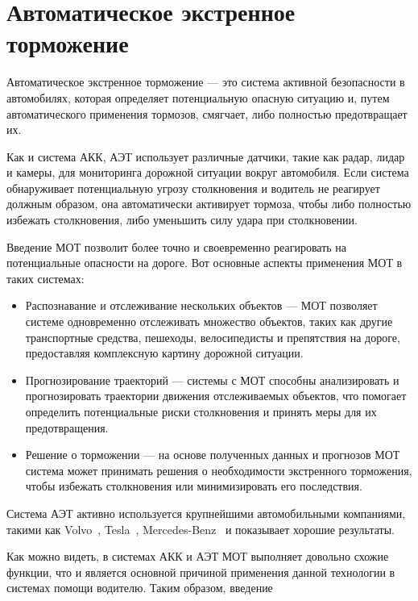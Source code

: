 \section{Автоматическое экстренное торможение}

Автоматическое экстренное торможение --- это система активной безопасности в автомобилях, которая определяет потенциальную опасную ситуацию и, путем автоматического применения тормозов, смягчает, либо полностью предотвращает их. 

Как и система АКК, АЭТ использует различные датчики, такие как радар, лидар и камеры, для мониторинга дорожной ситуации вокруг автомобиля. Если система обнаруживает потенциальную угрозу столкновения и водитель не реагирует должным образом, она автоматически активирует тормоза, чтобы либо полностью избежать столкновения, либо уменьшить силу удара при столкновении.

Введение МОТ позволит более точно и своевременно реагировать на потенциальные опасности на дороге. Вот основные аспекты применения МОТ в таких системах:

\begin{itemize}

	\item	Распознавание и отслеживание нескольких объектов --- МОТ позволяет системе одновременно отслеживать множество объектов, таких как другие транспортные средства, пешеходы, велосипедисты и препятствия на дороге, предоставляя комплексную картину дорожной ситуации.
	
	\item	Прогнозирование траекторий --- системы с МОТ способны анализировать и прогнозировать траектории движения отслеживаемых объектов, что помогает определить потенциальные риски столкновения и принять меры для их предотвращения.
	
	\item	Решение о торможении --- на основе полученных данных и прогнозов МОТ система может принимать решения о необходимости экстренного торможения, чтобы избежать столкновения или минимизировать его последствия.
	
\end{itemize}

Система АЭТ активно используется крупнейшими автомобильными компаниями, такими как Volvo~\cite{Volvo2009}, Tesla~\cite{Tesla2023}, Mercedes-Benz~\cite{MercedesBenz2021} и показывает хорошие результаты.

Как можно видеть, в системах АКК и АЭТ МОТ выполняет довольно схожие функции, что и является основной причиной применения данной технологии в системах помощи водителю. Таким образом, введение